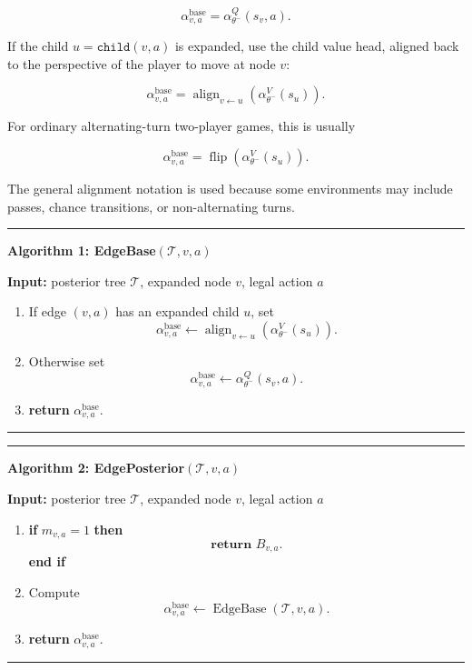 \documentclass[11pt]{article}
\newcommand{\Tree}{\mathcal{T}}
\newcommand{\Flip}{\operatorname{flip}}
\newcommand{\Align}{\operatorname{align}}
\newcommand{\EdgeBase}{\operatorname{EdgeBase}}
\newenvironment{algorithmblock}[1]
{
  \par\medskip
  \noindent\hrule\par\smallskip
  \noindent\textbf{#1}
  \par\smallskip
}
{
  \par\smallskip\noindent\hrule\par\medskip
}
\newcommand{\Input}{\textbf{Input: }}
\newcommand{\Return}{\textbf{return }}
\newcommand{\If}{\textbf{if }}
\newcommand{\Then}{\textbf{ then }}
\newcommand{\EndIf}{\textbf{end if}}
\begin{document}
\[
\alpha^{\mathrm{base}}_{v,a}
=
\alpha_{\theta^-}^Q(s_v,a).
\]

If the child \(u=\texttt{child}(v,a)\) is expanded, use the child value head,
aligned back to the perspective of the player to move at node \(v\):

\[
\alpha^{\mathrm{base}}_{v,a}
=
\Align_{v \leftarrow u}
\left(
\alpha_{\theta^-}^V(s_u)
\right).
\]

For ordinary alternating-turn two-player games, this is usually

\[
\alpha^{\mathrm{base}}_{v,a}
=
\Flip
\left(
\alpha_{\theta^-}^V(s_u)
\right).
\]

The general alignment notation is used because some environments may include
passes, chance transitions, or non-alternating turns.

\begin{algorithmblock}{Algorithm 1: EdgeBase\((\Tree,v,a)\)}

\Input posterior tree \(\Tree\), expanded node \(v\), legal action \(a\)

\begin{enumerate}[leftmargin=2em]
  \item If edge \((v,a)\) has an expanded child \(u\), set
  \[
  \alpha^{\mathrm{base}}_{v,a}
  \gets
  \Align_{v \leftarrow u}
  \left(
  \alpha_{\theta^-}^V(s_u)
  \right).
  \]

  \item Otherwise set
  \[
  \alpha^{\mathrm{base}}_{v,a}
  \gets
  \alpha_{\theta^-}^Q(s_v,a).
  \]

  \item \Return \(\alpha^{\mathrm{base}}_{v,a}\).
\end{enumerate}

\end{algorithmblock}

\begin{algorithmblock}{Algorithm 2: EdgePosterior\((\Tree,v,a)\)}

\Input posterior tree \(\Tree\), expanded node \(v\), legal action \(a\)

\begin{enumerate}[leftmargin=2em]
  \item \If \(m_{v,a}=1\) \Then
  \[
  \Return B_{v,a}.
  \]
  \EndIf

  \item Compute
  \[
  \alpha^{\mathrm{base}}_{v,a}
  \gets
  \EdgeBase(\Tree,v,a).
  \]

  \item \Return \(\alpha^{\mathrm{base}}_{v,a}\).
\end{enumerate}

\end{algorithmblock}
\end{document}
